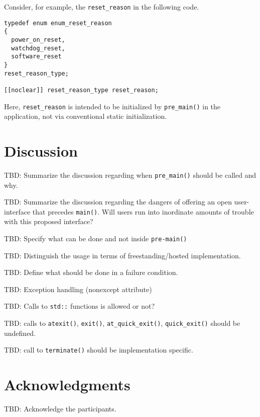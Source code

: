 \documentclass[11pt]{article}
\begin{document}
Consider, for example, the \lstinline{reset_reason} in
the following code.

\begin{lstlisting}
typedef enum enum_reset_reason
{
  power_on_reset,
  watchdog_reset,
  software_reset
}
reset_reason_type;

[[noclear]] reset_reason_type reset_reason;
\end{lstlisting}

\noindent
Here, \lstinline{reset_reason} is intended to be initialized by
\lstinline{pre_main()} in the application, not via conventional
static initialization.

\section{Discussion}

TBD: Summarize the discussion regarding when \lstinline{pre_main()}
should be called and why.

TBD: Summarize the discussion regarding the dangers of
offering an open user-interface that precedes \lstinline{main()}.
Will users run into inordinate amounts of trouble with this
proposed interface?

TBD: Specify what can be done and not inside \lstinline{pre-main()}

TBD: Distinguish the usage in terms of freestanding/hosted implementation.

TBD: Define what should be done in a failure condition. 

TBD: Exception handling (nonexcept attribute) 

TBD: Calls to \lstinline{std::} functions is allowed or not? 

TBD: calls to \lstinline{atexit()},
\lstinline{exit()},
\lstinline{at_quick_exit()},
\lstinline{quick_exit()} should be undefined.

TBD: call to \lstinline{terminate()} should be implementation specific.

\section{Acknowledgments}

TBD: Acknowledge the participants.
\end{document}
